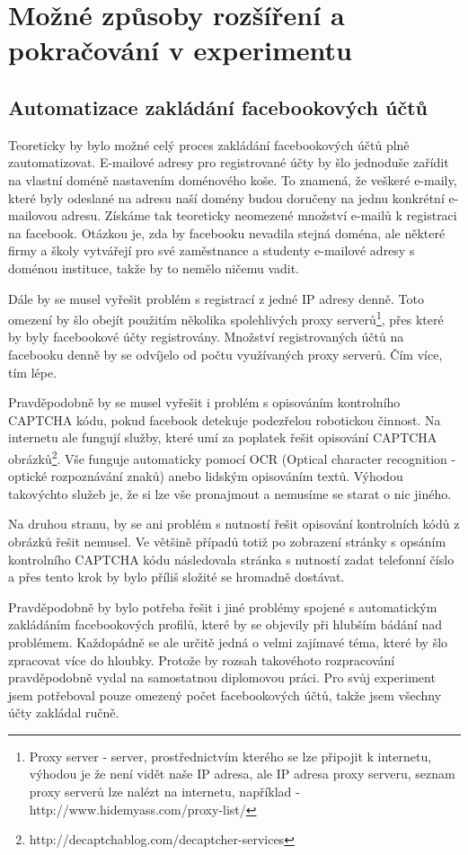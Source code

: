 \documentclass[thesis=M,czech]{FITthesis}[2013/05/10]
\begin{document}
\section{Možné způsoby rozšíření a pokračování v experimentu}

\subsection{Automatizace zakládání facebookových účtů}
Teoreticky by bylo možné celý proces zakládání facebookových účtů plně zautomatizovat. E-mailové adresy pro registrované účty by šlo jednoduše zařídit na vlastní doméně nastavením doménového koše. To znamená, že veškeré e-maily, které byly odeslané na adresu naší domény budou doručeny na jednu konkrétní e-mailovou adresu. Získáme tak teoreticky neomezené množství e-mailů k registraci na facebook. Otázkou je, zda by facebooku nevadila stejná doména, ale některé firmy a školy vytvářejí pro své zaměstnance a studenty e-mailové adresy s doménou instituce, takže by to nemělo ničemu vadit.

Dále by se musel vyřešit problém s registrací z jedné IP adresy denně. Toto omezení by šlo obejít použitím několika spolehlivých proxy serverů\footnote{Proxy server - server, prostřednictvím kterého se lze připojit k internetu, výhodou je že není vidět naše IP adresa, ale IP adresa proxy serveru, seznam proxy serverů lze nalézt na internetu, například - http://www.hidemyass.com/proxy-list/}, přes které by byly facebookové účty registrovány. Množství registrovaných účtů na facebooku denně by se odvíjelo od počtu využívaných proxy serverů. Čím více, tím lépe.

Pravděpodobně by se musel vyřešit i problém s opisováním kontrolního CAPTCHA kódu, pokud facebook detekuje podezřelou robotickou činnost. Na internetu ale fungují služby, které umí za poplatek řešit opisování CAPTCHA obrázků\footnote{http://decaptchablog.com/decaptcher-services}. Vše funguje automaticky pomocí OCR (Optical character recognition - optické rozpoznávání znaků) anebo lidským opisováním textů. Výhodou takovýchto služeb je, že si lze vše pronajmout a nemusíme se starat o nic jiného. 

Na druhou stranu, by se ani problém s nutností řešit opisování kontrolních kódů z obrázků řešit nemusel. Ve většině případů totiž po zobrazení stránky s opsáním kontrolního CAPTCHA kódu následovala stránka s nutností zadat telefonní číslo a přes tento krok by bylo příliš složité se hromadně dostávat.

Pravděpodobně by bylo potřeba řešit i jiné problémy spojené s automatickým zakládáním facebookových profilů, které by se objevily při hlubším bádání nad problémem. Každopádně se ale určitě jedná o velmi zajímavé téma, které by šlo zpracovat více do hloubky. Protože by rozsah takovéhoto rozpracování pravděpodobně vydal na samostatnou diplomovou práci. Pro svůj experiment jsem potřeboval pouze omezený počet facebookových účtů, takže jsem všechny účty zakládal ručně.
\end{document}
